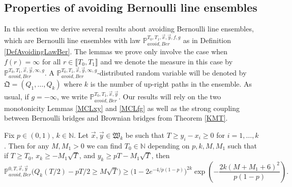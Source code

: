 \subsection{Properties of avoiding Bernoulli line ensembles}\label{Section3.3}  In this section we derive several results about avoiding Bernoulli line ensembles, which are Bernoulli line ensembles with law $\mathbb{P}_{avoid, Ber}^{T_0,T_1, \vec{x}, \vec{y}, f, g}$ as in Definition \ref{DefAvoidingLawBer}. The lemmas we prove only involve the case when $f(r) = \infty$ for all $r \in \llbracket T_0, T_1 \rrbracket$ and we denote the measure in this case by $\mathbb{P}_{avoid, Ber}^{T_0,T_1, \vec{x}, \vec{y}, \infty, g}$. A $\mathbb{P}_{avoid, Ber}^{T_0,T_1, \vec{x}, \vec{y}, \infty, g}$-distributed random variable will be denoted by $\mathfrak{Q} = (Q_1, \dots, Q_k)$ where $k$ is the number of up-right paths in the ensemble. As usual, if $g=-\infty$, we write $\mathbb{P}_{avoid, Ber}^{T_0,T_1, \vec{x}, \vec{y}}$. Our results will rely on the two monotonicity Lemmas \ref{MCLxy} and \ref{MCLfg} as well as the strong coupling between Bernoulli bridges and Brownian bridges from Theorem \ref{KMT}.


\begin{lemma}\label{prob19}
	Fix $p\in(0,1)$, $k\in\mathbb{N}$. Let $\vec{x},\vec{y}\in\mathfrak{W}_k$ be such that $T \geq y_i - x_i \geq 0$ for $i=1,\dots,k$. Then for any $M,M_1 > 0$ we can find $T_0\in\mathbb{N}$ depending on $p,k,M,M_1$ such that if $T\geq T_0$, $x_k \geq - M_1\sqrt{T}$, and $y_k \geq pT - M_1\sqrt{T}$, then
	\[
	\mathbb{P}^{0,T,\vec{x},\vec{y}}_{avoid, Ber}\Big(Q_k(T/2) - pT/2 \geq M\sqrt{T}\Big) \geq \big(1-2e^{-4/p(1-p)}\big)^{2k}\exp\left(-\frac{2k(M+M_1+6)^2}{p(1-p)}\right).
	\]
\end{lemma}

